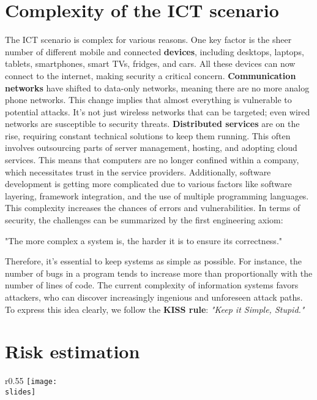 \section{Complexity of the ICT scenario}
The ICT scenario is complex for various reasons. One key factor is the sheer number of different mobile and connected \textbf{devices}, including desktops, laptops, tablets, smartphones, smart TVs, fridges, and cars. All these devices can now connect to the internet, making security a critical concern.
\textbf{Communication networks } have shifted to data-only networks, meaning there are no more analog phone networks. This change implies that almost everything is vulnerable to potential attacks. It's not just wireless networks that can be targeted; even wired networks are susceptible to security threats.
\textbf{Distributed services} are on the rise, requiring constant technical solutions to keep them running. This often involves outsourcing parts of server management, hosting, and adopting cloud services. This means that computers are no longer confined within a company, which necessitates trust in the service providers. Additionally, software development is getting more complicated due to various factors like software layering, framework integration, and the use of multiple programming languages. This complexity increases the chances of errors and vulnerabilities.
In terms of security, the challenges can be summarized by the first engineering axiom:
\begin{center}
  "The more complex a system is, the harder it is to ensure its correctness."
\end{center}
Therefore, it's essential to keep systems as simple as possible. For instance, the number of bugs in a program tends to increase more than proportionally with the number of lines of code. The current complexity of information systems favors attackers, who can discover increasingly ingenious and unforeseen attack paths.\\
To express this idea clearly, we follow the \textbf{KISS rule}: \emph{"Keep it Simple, Stupid."}








\section{Risk estimation}

\begin{wrapfigure}{r}{0.55\textwidth}
  \centering
  \texttt{[image: \\slides]}
\end{wrapfigure}


